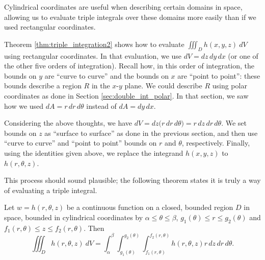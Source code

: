 Cylindrical coordinates are useful when describing certain domains in space, allowing us to evaluate triple integrals over these domains more easily than if we used rectangular coordinates.

Theorem \ref{thm:triple_integration2} shows how to evaluate $\iiint_Dh(x,y,z)\ dV$ using rectangular coordinates. In that evaluation, we use $dV = dz\,dy\,dx$ (or one of the other five orders of integration). Recall how, in this order of integration, the bounds on $y$ are ``curve to curve'' and the bounds on $x$ are ``point to point'': these bounds describe a region $R$ in the $x$-$y$ plane. We could describe $R$ using polar coordinates as done in Section \ref{sec:double_int_polar}. In that section, we saw how we used $dA = r\,dr\,d\theta$ instead of $dA = dy\,dx$. 

Considering the above thoughts, we have $dV = dz\big(r\,dr\,d\theta\big) = r\,dz\,dr\,d\theta$. We set bounds on $z$ as ``surface to surface'' as done in the previous section, and then use ``curve to curve'' and ``point to point'' bounds on $r$ and $\theta$, respectively. Finally, using the identities given above, we replace the integrand $h(x,y,z)$ to $h(r,\theta,z)$.

This process should sound plausible; the following theorem states it is truly a way of evaluating a triple integral.

{%
Let $w=h(r,\theta,z)$ be a continuous function on a closed, bounded region $D$ in space, bounded in cylindrical coordinates by $\alpha \leq \theta \leq \beta$, $g_1(\theta)\leq r \leq g_2(\theta)$ and $f_1(r,\theta) \leq z \leq f_2(r,\theta)$. Then  
$$\iiint_D h(r,\theta,z)\ dV = \int_\alpha^\beta\int_{g_1(\theta)}^{g_2(\theta)}\int_{f_1(r,\theta)}^{f_2(r,\theta)}h(r,\theta,z) r\,dz\,dr\,d\theta.$$
}

